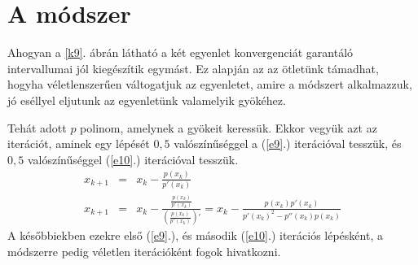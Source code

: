 \documentclass[a4paper,12pt]{report}
\begin{document}
		\section{A módszer}

			Ahogyan a \ref{k9}. ábrán látható a két egyenlet konvergenciát garantáló intervallumai jól kiegészítik egymást. Ez alapján az az ötletünk támadhat, hogyha véletlenszerűen váltogatjuk az egyenletet, amire a módszert alkalmazzuk, jó eséllyel eljutunk az egyenletünk valamelyik gyökéhez.

			Tehát adott $p$ polinom, amelynek a gyökeit keressük. Ekkor vegyük azt az iterációt, aminek egy lépését $0,\!5$ valószínűséggel a (\ref{e9}.) iterációval tesszük, és $0,\!5$ valószínűséggel (\ref{e10}.) iterációval tesszük.
			\begin{eqnarray}
				\label{e9}x_{k+1}&=&x_k- \frac{p(x_k)}{p'(x_k)}\\
				\label{e10}x_{k+1}&=&x_k-\frac{\frac{p(x_k)}{p'(x_k)}}{\left(\frac{p(x_k)}{p'(x_k)}\right)'}=x_k-\frac{p(x_k)p'(x_k)}{p'(x_k)^2-p''(x_k)p(x_k)}
			\end{eqnarray}
			A későbbiekben ezekre első (\ref{e9}.), és második (\ref{e10}.) iterációs lépésként, a módszerre pedig véletlen iterációként fogok hivatkozni.
\end{document}
